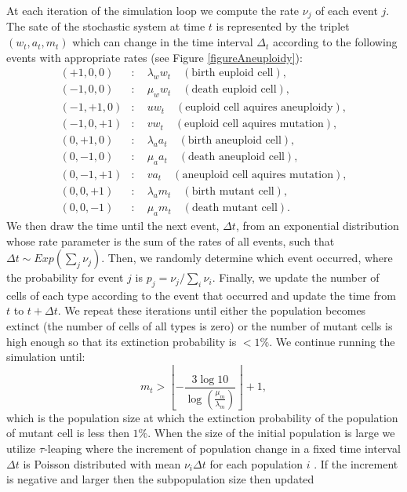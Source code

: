 \documentclass[12pt]{extarticle}
\begin{document}
At each iteration of the simulation loop we compute the rate $\nu_j$ of each event $j$. %
The sate of the stochastic system at time $t$ is represented by the triplet $\left(w_t,a_t,m_t\right)$ which can change in the time interval $\Delta_t$ according to the following events with appropriate rates (see Figure \ref{figureAneuploidy}):
\begin{subequations}
\begin{flalign*}
(+1,0,0)&:\quad \lambda_ww_t\quad\left(\text{birth euploid cell}\right),\\
(-1,0,0)&:\quad \mu_ww_t\quad\left(\text{death euploid cell}\right),\\
(-1,+1,0)&:\quad uw_t\quad\left(\text{euploid cell aquires aneuploidy}\right),\\
(-1,0,+1)&:\quad vw_t\quad\left(\text{euploid cell aquires mutation}\right),\\
(0,+1,0)&:\quad \lambda_aa_t\quad\left(\text{birth aneuploid cell}\right),\\
(0,-1,0)&:\quad \mu_aa_t\quad\left(\text{death aneuploid cell}\right),\\
(0,-1,+1)&:\quad va_t\quad\left(\text{aneuploid cell aquires mutation}\right),\\
(0,0,+1)&:\quad \lambda_am_t\quad\left(\text{birth mutant cell}\right),\\
(0,0,-1)&:\quad \mu_am_t\quad\left(\text{death mutant cell}\right).
\end{flalign*}
\end{subequations}
We then draw the time until the next event, $\Delta t$, from an exponential distribution whose rate parameter is the sum of the rates of all events, such that $\Delta t \sim \textit{Exp}(\sum_j \nu_j)$.
Then, we randomly determine which event occurred, where the probability for event $j$ is $p_j=\nu_j/\sum_i \nu_i$.
Finally, we update the number of cells of each type according to the event that occurred and update the time from $t$ to $t+\Delta t$. %
We repeat these iterations until either the population becomes extinct (the number of cells of all types is zero) or the number of mutant cells is high enough so that its extinction probability is $<1\%$. %
We continue running the simulation until:
\begin{equation*}
m_t>\left\lfloor-\frac{3\log10}{\log\left(\frac{\mu_m}{\lambda_m}\right)}\right\rfloor+1,
\end{equation*}
which is the population size at which the extinction probability of the population of mutant cell is less then $1\%$. 
When the size of the initial population is large we utilize $\tau$-leaping where the increment of population change in a fixed time interval $\Delta t$ is Poisson distributed with mean $\nu_i\Delta t$ for each population $i$ \cite{gillespie2001approximate}. If the increment is negative and larger then the subpopulation size then updated 
\end{document}
